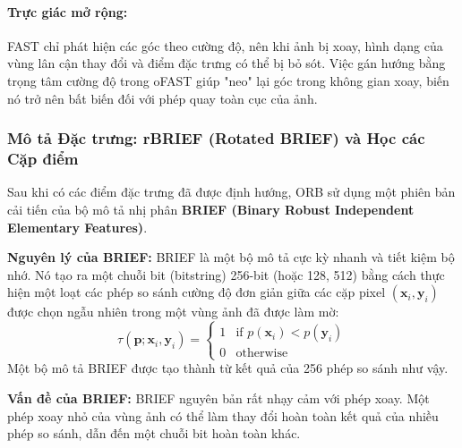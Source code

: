 \paragraph{Trực giác mở rộng:} 
FAST chỉ phát hiện các góc theo cường độ, nên khi ảnh bị xoay, hình dạng của vùng lân cận thay đổi và điểm đặc trưng có thể bị bỏ sót. 
Việc gán hướng bằng trọng tâm cường độ trong oFAST giúp "neo" lại góc trong không gian xoay, biến nó trở nên bất biến đối với phép quay toàn cục của ảnh.

\subsubsection{Mô tả Đặc trưng: rBRIEF (Rotated BRIEF) và Học các Cặp điểm}
\label{subsubsec:orb_rbrief}
Sau khi có các điểm đặc trưng đã được định hướng, ORB sử dụng một phiên bản cải tiến của bộ mô tả nhị phân \textbf{BRIEF (Binary Robust Independent Elementary Features)}.

\textbf{Nguyên lý của BRIEF:} BRIEF là một bộ mô tả cực kỳ nhanh và tiết kiệm bộ nhớ. Nó tạo ra một chuỗi bit (bitstring) 256-bit (hoặc 128, 512) bằng cách thực hiện một loạt các phép so sánh cường độ đơn giản giữa các cặp pixel $( \mathbf{x}_i, \mathbf{y}_i )$ được chọn ngẫu nhiên trong một vùng ảnh đã được làm mờ:
\begin{equation}
    \tau(\mathbf{p}; \mathbf{x}_i, \mathbf{y}_i) = 
    \begin{cases} 
        1 & \text{if } p(\mathbf{x}_i) < p(\mathbf{y}_i) \\
        0 & \text{otherwise}
    \end{cases}
\end{equation}
Một bộ mô tả BRIEF được tạo thành từ kết quả của 256 phép so sánh như vậy.

\textbf{Vấn đề của BRIEF:} BRIEF nguyên bản rất nhạy cảm với phép xoay. Một phép xoay nhỏ của vùng ảnh có thể làm thay đổi hoàn toàn kết quả của nhiều phép so sánh, dẫn đến một chuỗi bit hoàn toàn khác.

